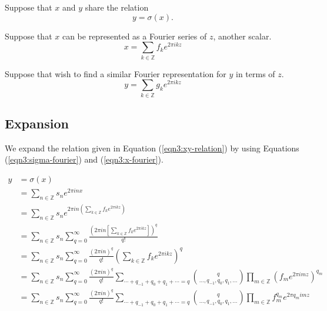 \documentclass{article}
\begin{document}
    Suppose that $x$ and $y$ share the relation
    \begin{equation}
        y = \sigma(x).
        \label{eqn3:xy-relation}
    \end{equation}

    Suppose that $x$ can be represented as a Fourier series of $z$, another scalar.
    \begin{equation}
        x = \sum_{k \in \mathbb{Z}} f_k e^{2\pi i k z}
        \label{eqn3:x-fourier}
    \end{equation}

    Suppose that wish to find a similar Fourier representation for $y$ in terms of $z$.
    \begin{equation}
        y = \sum_{k \in \mathbb{Z}} g_k e^{2\pi i k z}
        \label{eqn3:y-fourier}
    \end{equation}

    \subsection{Expansion}
    We expand the relation given in Equation (\ref{eqn3:xy-relation}) by using Equations (\ref{eqn3:sigma-fourier}) and (\ref{eqn3:x-fourier}).

    \begin{align}
        y &= \sigma(x) \nonumber \\
        &= \sum_{n \in \mathbb{Z}} s_n e^{2 \pi i n x} \nonumber \\
        &= \sum_{n \in \mathbb{Z}} s_n e^{2 \pi i n \left(\sum_{k \in \mathbb{Z}} f_k e^{2\pi i k z}\right)} \nonumber \\
        &= \sum_{n \in \mathbb{Z}} s_n \sum_{q=0}^{\infty} \frac{\left(2 \pi i n \left[\sum_{k \in \mathbb{Z}} f_k e^{2\pi i k z}\right]\right)^q}{q!} \nonumber \\
        &= \sum_{n \in \mathbb{Z}} s_n \sum_{q=0}^{\infty} \frac{\left(2\pi in\right)^q}{q!} \left(\sum_{k \in \mathbb{Z}} f_k e^{2\pi ikz} \right)^q \nonumber \\
        &= \sum_{n \in \mathbb{Z}} s_n \sum_{q=0}^{\infty} \frac{(2\pi i n)^q}{q!} \sum_{\cdots + q_{-1} + q_{0} + q_{1} + \cdots = q} \binom{q}{\ldots, q_{-1}, q_{0}, q_{1}, \ldots} \prod_{m \in \mathbb{Z}} (f_m e^{2\pi imz})^{q_m} \nonumber \\
        &= \sum_{n \in \mathbb{Z}} s_n \sum_{q=0}^{\infty} \frac{(2\pi i n)^q}{q!} \sum_{\cdots + q_{-1} + q_{0} + q_{1} + \cdots = q} \binom{q}{\ldots, q_{-1}, q_{0}, q_{1}, \ldots} \prod_{m \in \mathbb{Z}} f_m^{q_m} e^{2\pi q_m imz}
        \label{eqn3:xy-expansion}
    \end{align}
\end{document}
